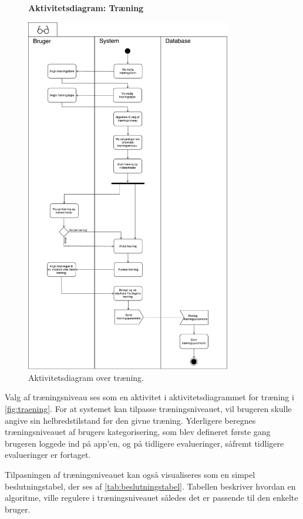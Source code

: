 \begin{figure} [H]
\centering
\textbf{Aktivitetsdiagram: Træning}\par\medskip
\includegraphics[width=0.8\textwidth]{figures/aktivitetsdiagram/NYTraening}
\caption{Aktivitetsdiagram over træning.}
\label{fig:traeningsniveau}
\end{figure}

\noindent
Valg af træningsniveau ses som en aktivitet i aktivitetsdiagrammet for træning i \autoref{fig:traening}. For at systemet kan tilpasse træningsniveauet, vil brugeren skulle angive sin helbredstilstand før den givne træning. Yderligere beregnes træningsniveauet af brugers kategorisering, som blev defineret første gang brugeren loggede ind på app'en, og på tidligere evalueringer, såfremt tidligere evalueringer er fortaget.


Tilpasningen af træningsniveauet kan også visualiseres som en simpel beslutningstabel, der ses af \autoref{tab:beslutningstabel}. Tabellen beskriver hvordan en algoritme, ville regulere i træningsniveauet således det er passende til den enkelte bruger.  

